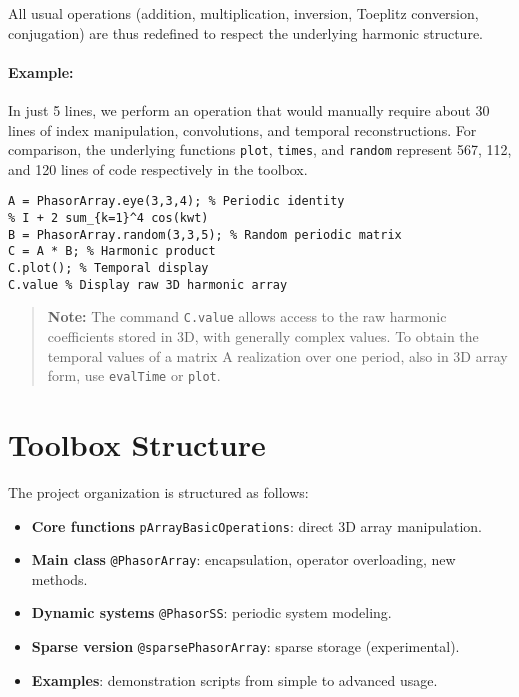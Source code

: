 \documentclass[11pt,a4paper]{article}
\begin{document}
All usual operations (addition, multiplication, inversion, Toeplitz conversion, conjugation) are thus redefined to respect the underlying harmonic structure.

\paragraph{Example:}
In just 5 lines, we perform an operation that would manually require about 30 lines of index manipulation, convolutions, and temporal reconstructions. For comparison, the underlying functions \texttt{plot}, \texttt{times}, and \texttt{random} represent 567, 112, and 120 lines of code respectively in the toolbox.

\begin{lstlisting}[style=matlabstyle]
A = PhasorArray.eye(3,3,4); % Periodic identity 
% I + 2 sum_{k=1}^4 cos(kwt)
B = PhasorArray.random(3,3,5); % Random periodic matrix
C = A * B; % Harmonic product
C.plot(); % Temporal display
C.value % Display raw 3D harmonic array
\end{lstlisting}

\begin{quote}
\textbf{Note:} The command \texttt{C.value} allows access to the raw harmonic coefficients stored in 3D, with generally complex values. To obtain the temporal values of a matrix A realization over one period, also in 3D array form, use \texttt{evalTime} or \texttt{plot}.
\end{quote}

\section{Toolbox Structure}

The project organization is structured as follows:
\begin{itemize}
    \item \textbf{Core functions} \texttt{pArrayBasicOperations}: direct 3D array manipulation.
    \item \textbf{Main class} \texttt{@PhasorArray}: encapsulation, operator overloading, new methods.
    \item \textbf{Dynamic systems} \texttt{@PhasorSS}: periodic system modeling.
    \item \textbf{Sparse version} \texttt{@sparsePhasorArray}: sparse storage (experimental).
    \item \textbf{Examples}: demonstration scripts from simple to advanced usage.
\end{itemize}
\end{document}
